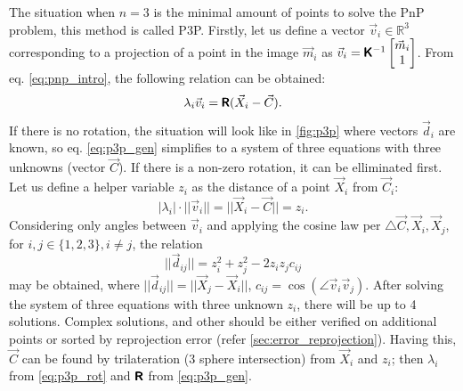 The situation when $n=3$ is the minimal amount of points to solve the PnP problem, this method is called P3P.  
Firstly, let us define a vector $\vec{v}_i \in \mathbb{R}^3$ corresponding to a projection of a point in the image $\vec{m}_i$ as $\vec{v}_i = \pmb{\mathsf{K}}^{-1}\begin{bmatrix}\vec{m}_i \\ 1 \end{bmatrix}$. From eq. \eqref{eq:pnp_intro}, the following relation can be obtained:
\begin{equation}
    \label{eq:p3p_gen}
    \lambda_i \vec{v}_i = \pmb{\mathsf{R}} (\vec{X}_i - \vec{C}).
\end{equation}
If there is no rotation, the situation will look like in \autoref{fig:p3p} where vectors $\vec{d}_i$ are known, so eq. \eqref{eq:p3p_gen} simplifies to a system of three equations with three unknowns (vector $\vec{C}$).
If there is a non-zero rotation, it can be elliminated first.
Let us define a helper variable $z_i$ as the distance of a point $\vec{X}_i$ from $\vec{C}_i$:
\begin{equation}
    \label{eq:p3p_rot}
    |\lambda_i| \cdot ||\vec{v}_i|| = || \vec{X}_i - \vec{C} || = z_i.
\end{equation}
Considering only angles between $\vec{v}_i$ and applying the cosine law per $\triangle{\vec{C}, \vec{X}_i, \vec{X}_j}$, for $i, j \in \{1, 2, 3\}, i \neq j$, the relation
\begin{equation}
    ||\vec{d}_{ij}|| = z_i^2 + z_j^2 - 2z_iz_jc_{ij}
\end{equation}
may be obtained, where $||\vec{d}_{ij}|| = || \vec{X}_j - \vec{X}_i ||$, $c_{ij} = \cos(\angle \vec{v}_i \vec{v}_j)$.
After solving the system of three equations with three unknown $z_i$, there will be up to 4 solutions.
Complex solutions, and other should be either verified on additional points \cite{Fischler1981} or sorted by reprojection error (refer \autoref{sec:error_reprojection}).
Having this, $\vec{C}$ can be found by trilateration (3 sphere intersection) from $\vec{X}_i$ and $z_i$; then $\lambda_i$ from \eqref{eq:p3p_rot} and $\pmb{\mathsf{R}}$ from \eqref{eq:p3p_gen}.

